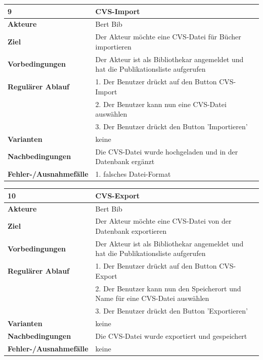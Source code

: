 \documentclass[fontsize=12pt,paper=a4,twoside]{scrartcl}
\begin{document}
\begin{table}[htbp]
\label{9}
\begin{tabular}{|l|p{10cm}|}
\hline 
\textbf{9} & \textbf{CVS-Import} \\ \hline
\textbf{Akteure} & Bert Bib\\ \hline
\textbf{Ziel} & Der Akteur möchte eine CVS-Datei für Bücher importieren \\ \hline
\textbf{Vorbedingungen} & Der Akteur ist als Bibliothekar angemeldet und hat die Publikationsliste 
aufgerufen \\ \hline
\textbf{Regulärer Ablauf} & 
1. Der Benutzer drückt auf den Button CVS-Import \\
&2. Der Benutzer kann nun eine CVS-Datei auswählen\\
&3. Der Benutzer drückt den Button 'Importieren'\\
\hline
\textbf{Varianten} & 
keine \\ \hline
\textbf{Nachbedingungen} & Die CVS-Datei wurde hochgeladen und in der Datenbank ergänzt\\\hline
\textbf{Fehler-/Ausnahmefälle} & 1. falsches Datei-Format\\
\hline
\end{tabular}
\end{table}

\begin{table}[htbp]
\label{10}
\begin{tabular}{|l|p{10cm}|}
\hline 
\textbf{10} & \textbf{CVS-Export} \\ \hline
\textbf{Akteure} & Bert Bib\\ \hline
\textbf{Ziel} & Der Akteur möchte eine CVS-Datei von der Datenbank exportieren \\ \hline
\textbf{Vorbedingungen} & Der Akteur ist als Bibliothekar angemeldet und hat die Publikationsliste 
aufgerufen \\ \hline
\textbf{Regulärer Ablauf} & 
1. Der Benutzer drückt auf den Button CVS-Export \\
&2. Der Benutzer kann nun den Speicherort und Name für eine CVS-Datei auswählen\\
&3. Der Benutzer drückt den Button 'Exportieren'\\
\hline
\textbf{Varianten} & 
keine \\ \hline
\textbf{Nachbedingungen} & Die CVS-Datei wurde exportiert und gespeichert\\ \hline
\textbf{Fehler-/Ausnahmefälle} & keine\\
\hline
\end{tabular}
\end{table}
\end{document}
